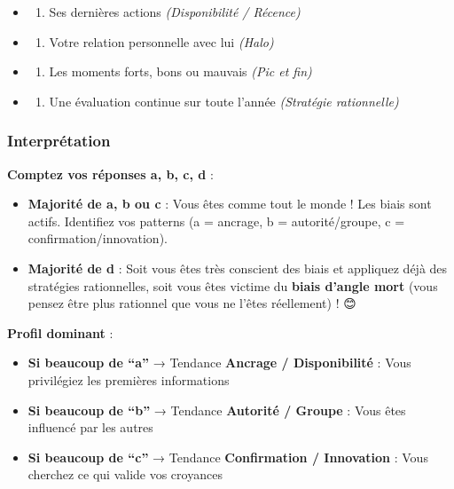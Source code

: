 \documentclass[
]{article}
\providecommand{\tightlist}{%
  \setlength{\itemsep}{0pt}\setlength{\parskip}{0pt}}
\begin{document}
\begin{itemize}
\tightlist
\item
  \begin{enumerate}
  \def\labelenumi{\alph{enumi})}
  \tightlist
  \item
    Ses dernières actions \emph{(Disponibilité / Récence)}
  \end{enumerate}
\item
  \begin{enumerate}
  \def\labelenumi{\alph{enumi})}
  \setcounter{enumi}{1}
  \tightlist
  \item
    Votre relation personnelle avec lui \emph{(Halo)}
  \end{enumerate}
\item
  \begin{enumerate}
  \def\labelenumi{\alph{enumi})}
  \setcounter{enumi}{2}
  \tightlist
  \item
    Les moments forts, bons ou mauvais \emph{(Pic et fin)}
  \end{enumerate}
\item
  \begin{enumerate}
  \def\labelenumi{\alph{enumi})}
  \setcounter{enumi}{3}
  \tightlist
  \item
    Une évaluation continue sur toute l'année \emph{(Stratégie
    rationnelle)}
  \end{enumerate}
\end{itemize}

\subsubsection{Interprétation}\label{interpruxe9tation}

\textbf{Comptez vos réponses a, b, c, d} :

\begin{itemize}
\item
  \textbf{Majorité de a, b ou c} : Vous êtes comme tout le monde ! Les
  biais sont actifs. Identifiez vos patterns (a = ancrage, b =
  autorité/groupe, c = confirmation/innovation).
\item
  \textbf{Majorité de d} : Soit vous êtes très conscient des biais et
  appliquez déjà des stratégies rationnelles, soit vous êtes victime du
  \textbf{biais d'angle mort} (vous pensez être plus rationnel que vous
  ne l'êtes réellement) ! 😊
\end{itemize}

\textbf{Profil dominant} :

\begin{itemize}
\tightlist
\item
  \textbf{Si beaucoup de ``a''} → Tendance \textbf{Ancrage /
  Disponibilité} : Vous privilégiez les premières informations
\item
  \textbf{Si beaucoup de ``b''} → Tendance \textbf{Autorité / Groupe} :
  Vous êtes influencé par les autres
\item
  \textbf{Si beaucoup de ``c''} → Tendance \textbf{Confirmation /
  Innovation} : Vous cherchez ce qui valide vos croyances
\end{itemize}
\end{document}

